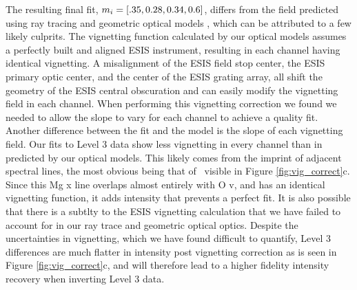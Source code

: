 The resulting final fit, $m_i = [.35, 0.28, 0.34, 0.6]$, differs from the field predicted using ray tracing and geometric optical models \citep{ESIS}, which can be attributed to a few likely culprits. 
The vignetting function calculated by our optical models assumes a perfectly built and aligned ESIS instrument, resulting in each channel having identical vignetting.
A misalignment of the ESIS field stop center, the ESIS primary optic center, and the center of the ESIS grating array, all shift the geometry of the ESIS central obscuration and can easily modify the vignetting field in each channel.
When performing this vignetting correction we found we needed to allow the slope to vary for each channel to achieve a quality fit.
Another difference between the fit and the model is the slope of each vignetting field.
Our fits to Level 3 data show less vignetting in every channel than in predicted by our optical models. 
This likely comes from the imprint of adjacent spectral lines, the most obvious being that of \mgxdim \ visible in Figure \ref{fig:vig_correct}c.
Since this Mg {\sc x} line overlaps almost entirely with O {\sc v}, and has an identical vignetting function, it adds intensity that prevents a perfect fit. 
It is also possible that there is a subtlty to the ESIS vignetting calculation that we have failed to account for in our ray trace and geometric optical optics.
Despite the uncertainties in vignetting, which we have found difficult to quantify, Level 3 differences are much flatter in intensity post vignetting correction as is seen in Figure \ref{fig:vig_correct}c, and will therefore lead to a higher fidelity intensity recovery when inverting Level 3 data.

